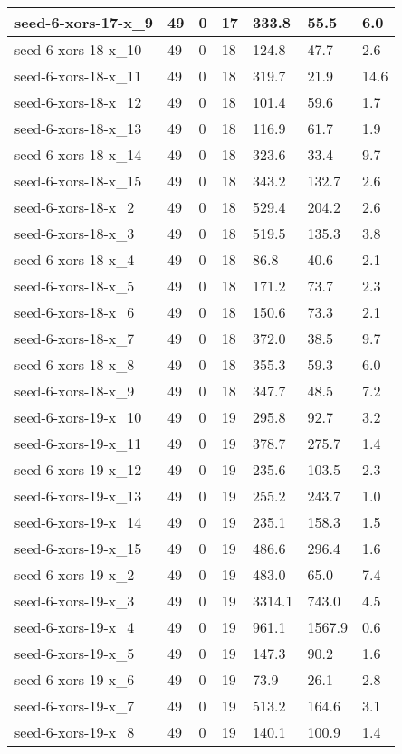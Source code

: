 \begin{scriptsize}
\begin{longtable}{|p{5cm}|l|l|l|l|l|l|}
seed-6-xors-17-x\_9&49&0&17&333.8&55.5&6.0 \\ \hline 
seed-6-xors-18-x\_10&49&0&18&124.8&47.7&2.6 \\ \hline 
seed-6-xors-18-x\_11&49&0&18&319.7&21.9&14.6 \\ \hline 
seed-6-xors-18-x\_12&49&0&18&101.4&59.6&1.7 \\ \hline 
seed-6-xors-18-x\_13&49&0&18&116.9&61.7&1.9 \\ \hline 
seed-6-xors-18-x\_14&49&0&18&323.6&33.4&9.7 \\ \hline 
seed-6-xors-18-x\_15&49&0&18&343.2&132.7&2.6 \\ \hline 
seed-6-xors-18-x\_2&49&0&18&529.4&204.2&2.6 \\ \hline 
seed-6-xors-18-x\_3&49&0&18&519.5&135.3&3.8 \\ \hline 
seed-6-xors-18-x\_4&49&0&18&86.8&40.6&2.1 \\ \hline 
seed-6-xors-18-x\_5&49&0&18&171.2&73.7&2.3 \\ \hline 
seed-6-xors-18-x\_6&49&0&18&150.6&73.3&2.1 \\ \hline 
seed-6-xors-18-x\_7&49&0&18&372.0&38.5&9.7 \\ \hline 
seed-6-xors-18-x\_8&49&0&18&355.3&59.3&6.0 \\ \hline 
seed-6-xors-18-x\_9&49&0&18&347.7&48.5&7.2 \\ \hline 
seed-6-xors-19-x\_10&49&0&19&295.8&92.7&3.2 \\ \hline 
seed-6-xors-19-x\_11&49&0&19&378.7&275.7&1.4 \\ \hline 
seed-6-xors-19-x\_12&49&0&19&235.6&103.5&2.3 \\ \hline 
seed-6-xors-19-x\_13&49&0&19&255.2&243.7&1.0 \\ \hline 
seed-6-xors-19-x\_14&49&0&19&235.1&158.3&1.5 \\ \hline 
seed-6-xors-19-x\_15&49&0&19&486.6&296.4&1.6 \\ \hline 
seed-6-xors-19-x\_2&49&0&19&483.0&65.0&7.4 \\ \hline 
seed-6-xors-19-x\_3&49&0&19&3314.1&743.0&4.5 \\ \hline 
seed-6-xors-19-x\_4&49&0&19&961.1&1567.9&0.6 \\ \hline 
seed-6-xors-19-x\_5&49&0&19&147.3&90.2&1.6 \\ \hline 
seed-6-xors-19-x\_6&49&0&19&73.9&26.1&2.8 \\ \hline 
seed-6-xors-19-x\_7&49&0&19&513.2&164.6&3.1 \\ \hline 
seed-6-xors-19-x\_8&49&0&19&140.1&100.9&1.4 \\ \hline 

\end{longtable}
\end{scriptsize}
